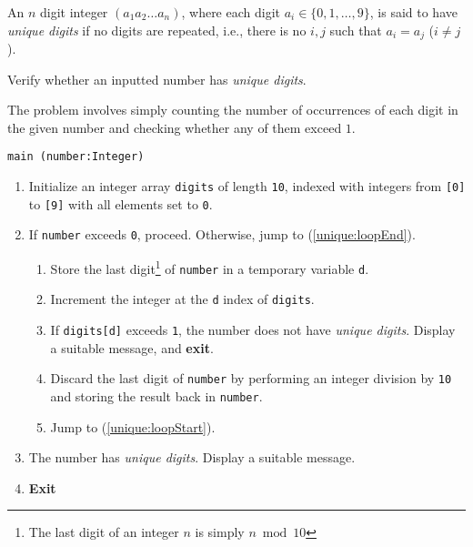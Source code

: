 

\problem An $n$ digit integer $(a_1a_2\dots a_n)$, where each digit $a_i \in \{0, 1, \dots, 9\}$,
is said to have {\em unique digits} if no digits are repeated, i.e., there is no $i, j$ such that $a_i = a_j$ ($i \neq j$).

Verify whether an inputted number has {\em unique digits}.

\solution The problem involves simply counting the number of occurrences of each digit in the given number and checking whether any of them exceed $1$.

\algorithm
{\tt main (number:Integer)}
\begin{enumerate}
	\item	Initialize an integer array {\tt digits} of length {\tt 10}, indexed with integers
			from {\tt [0]} to {\tt [9]} with all elements set to {\tt 0}.
	\item	If {\tt number} exceeds {\tt 0}, proceed.
			Otherwise, jump to (\ref{unique:loopEnd}). \label{unique:loopStart}
	\begin{enumerate}
		\item	Store the last digit\footnote{The last digit of an integer $n$ is simply $n \bmod 10$}
				of {\tt number} in a temporary variable {\tt d}.
		\item	Increment the integer at the {\tt d} index of {\tt digits}.
		\item	If {\tt digits[d]} exceeds {\tt 1}, the number does not have {\em unique digits}. Display a suitable
				message, and {\bf exit}.
		\item	Discard the last digit of {\tt number} by performing an integer division by {\tt 10} and storing
				the result back in {\tt number}.
		\item	Jump to (\ref{unique:loopStart}).
	\end{enumerate}
	\item	The number has {\em unique digits}. Display a suitable message. \label{unique:loopEnd}
	\item	{\bf Exit}
\end{enumerate}

\clearpage
\sourcecode


